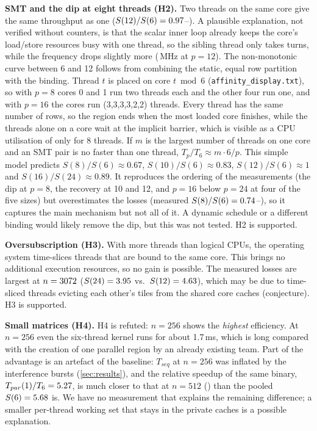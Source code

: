 \documentclass[conference,a4paper]{IEEEtran}
\begin{document}
\textbf{SMT and the dip at eight threads (H2).} Two threads on the same core give the same throughput as one
($S(12)/S(6)=0.97$--\SmtGainMax). A plausible explanation, not verified without counters, is that the scalar
inner loop already keeps the core's load/store resources busy with one thread, so the sibling thread only takes
turns, while the frequency drops slightly more (\FreqTwelve\,MHz at $p=12$). The non-monotonic curve between 6 and 12
follows from combining the static, equal row partition with the binding. Thread $t$ is placed on core $t\bmod6$
(\texttt{affinity\_display.txt}), so with $p=8$ cores 0 and 1 run two threads each and the other four run one, and
with $p=16$ the cores run (3,3,3,3,2,2) threads. Every thread has the same number of rows, so the region ends when
the most loaded core finishes, while the threads alone on a core wait at the implicit barrier, which is visible as a
CPU utilisation of only \CpuUtilEight{} for 8 threads. If $m$ is the largest number of threads on one core and an
SMT pair is no faster than one thread, $T_p/T_6\approx m\cdot6/p$. This simple model predicts
$S(8)/S(6)\approx0.67$, $S(10)/S(6)\approx0.83$, $S(12)/S(6)\approx1$ and $S(16)/S(24)\approx0.89$. It
reproduces the ordering of the measurements (the dip at $p=8$, the recovery at 10 and 12, and $p=16$ below $p=24$ at
four of the five sizes) but overestimates the losses (measured $S(8)/S(6)=0.74$--\EightDipMax), so it
captures the main mechanism but not all of it. A dynamic schedule or a different binding would likely remove the
dip, but this was not tested. H2 is supported.

\textbf{Oversubscription (H3).} With more threads than logical CPUs, the operating system time-slices threads that
are bound to the same core. This brings no additional execution resources, so no gain is possible. The measured
losses are largest at $n=3072$ ($S(24)=3.95$ vs.\ $S(12)=4.63$),
which may be due to time-sliced threads evicting each other's tiles from the shared core caches (conjecture). H3 is
supported.

\textbf{Small matrices (H4).} H4 is refuted: $n=256$ shows the \emph{highest} efficiency. At $n=256$ even the
six-thread kernel runs for about 1.7\,ms, which is long compared with the creation of one parallel region by an
already existing team. Part of the advantage is an artefact of the baseline: $T_{seq}$ at $n=256$ was inflated by the
interference bursts (\cref{sec:results}), and the relative speedup of the same binary,
$T_{par}(1)/T_6=5.27$, is much closer to that at $n=512$ (\SRelSixNFiveTwelve) than the pooled
$S(6)=5.68$ is. We have no measurement that explains the remaining difference; a smaller per-thread working
set that stays in the private caches is a possible explanation.
\end{document}
